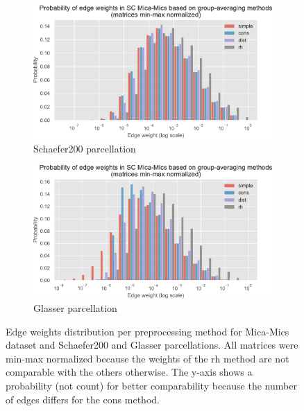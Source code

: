 \begin{figure}[p]
\begin{subfigure}{\textwidth}
      \begin{center}
    \includegraphics[width=\textwidth]{images/nootebook_generated/comparing_sc_matrices/schaefer/Probability_of_edge_weights_in_SC_Mica-Mics_based_on_group-averaging_methods_(matrices_min-max_normalized).pdf}
  \end{center}
  \caption{Schaefer200 parcellation}
  \label{fig:edge_weights_schaefer}
\end{subfigure}

\bigskip

\begin{subfigure}{\textwidth}
      \begin{center}
    \includegraphics[width=\textwidth]{images/nootebook_generated/comparing_sc_matrices/MNI-HCP-MMP1/Probability_of_edge_weights_in_SC_Mica-Mics_based_on_group-averaging_methods_(matrices_min-max_normalized).pdf}
  \end{center}
  \caption{Glasser parcellation}
  \label{fig:edge_weights_glasser}
\end{subfigure}
\caption[Edge weights distribution per preprocessing method]{Edge weights distribution per preprocessing method for Mica-Mics dataset and Schaefer200 and Glasser parcellations. All matrices were min-max normalized because the weights of the rh method are not comparable with the others otherwise. The y-axis shows a probability (not count) for better comparability because the number of edges differs for the cons method.}
\end{figure}

